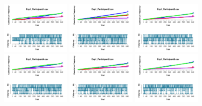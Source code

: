 \begin{figure}[th]
\centering
\includegraphics[width=0.30\textwidth]{Figures/Outcome_Exp1_P1} \includegraphics[width=0.30\textwidth]{Figures/Outcome_Exp1_P2} \includegraphics[width=0.30\textwidth]{Figures/Outcome_Exp1_P3}
\includegraphics[width=0.30\textwidth]{Figures/Outcome_Exp1_P4} \includegraphics[width=0.30\textwidth]{Figures/Outcome_Exp1_P5} \includegraphics[width=0.30\textwidth]{Figures/Outcome_Exp1_P6}

\end{figure}
